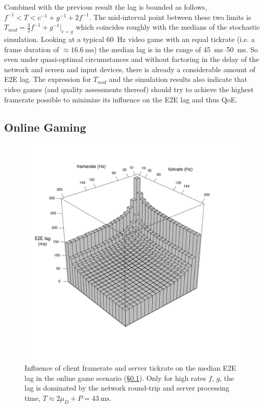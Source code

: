 Combined with the previous result the lag is bounded as follows, $f^{-1} < T < c^{-1}+g^{-1}+2f^{-1}$. The mid-interval point between these two limits is $T_{mid}=\frac{3}{2} f^{-1} + g^{-1}|_{c=g}$ which coincides roughly with the medians of the stochastic simulation. Looking at a typical \SI{60}{\hertz} video game with an equal tickrate (i.e. a frame duration of $\approx \SI{16.6}{\milli\second}$) the median lag is in the range of \SIrange{45}{50}{\milli\second}. So even under quasi-optimal circumstances and without factoring in the delay of the network and screen and input devices, there is already a considerable amount of \gls{E2E} lag. The expression for $T_{mid}$ and the simulation results also indicate that video games (and quality assessments thereof) should try to achieve the highest framerate possible to minimize its influence on the \gls{E2E} lag and thus \gls{QoE}.

\subsection{Online Gaming}
\label{subsec:online-gaming}


\begin{figure}[!t]
	\centering
	\vspace{-6mm}
	\includegraphics[width=1.0\columnwidth]{../../../simulation/visualization/e2e-lag-3dbars.pdf}
	\vspace{-15mm}
	\caption{Influence of client framerate and server tickrate on the median \gls{E2E} lag in the online game scenario (§\ref{subsec:online-gaming}). Only for high rates $f$, $g$, the lag is dominated by the network round-trip and server processing time, $T\approx2\mu_D+P=\SI{43}{\milli\second}$.}
\label{fig:3dbars-framerate-tickrate-lag}
\end{figure}

